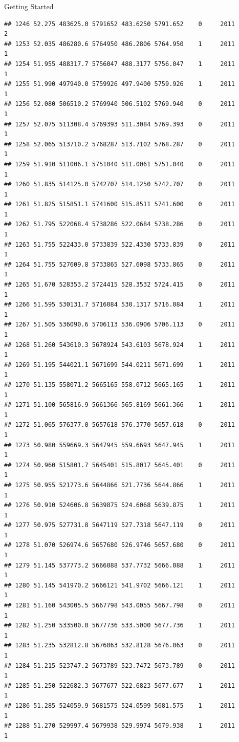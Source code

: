 \documentclass[
  ignorenonframetext,
]{beamer}
\begin{document}
\begin{frame}[fragile]{Getting Started}
\begin{verbatim}
## 1246 52.275 483625.0 5791652 483.6250 5791.652    0     2011        2
## 1253 52.035 486280.6 5764950 486.2806 5764.950    1     2011        1
## 1254 51.955 488317.7 5756047 488.3177 5756.047    1     2011        1
## 1255 51.990 497940.0 5759926 497.9400 5759.926    1     2011        1
## 1256 52.080 506510.2 5769940 506.5102 5769.940    0     2011        1
## 1257 52.075 511308.4 5769393 511.3084 5769.393    0     2011        1
## 1258 52.065 513710.2 5768287 513.7102 5768.287    0     2011        1
## 1259 51.910 511006.1 5751040 511.0061 5751.040    0     2011        1
## 1260 51.835 514125.0 5742707 514.1250 5742.707    0     2011        1
## 1261 51.825 515851.1 5741600 515.8511 5741.600    0     2011        1
## 1262 51.795 522068.4 5738286 522.0684 5738.286    0     2011        1
## 1263 51.755 522433.0 5733839 522.4330 5733.839    0     2011        1
## 1264 51.755 527609.8 5733865 527.6098 5733.865    0     2011        1
## 1265 51.670 528353.2 5724415 528.3532 5724.415    0     2011        1
## 1266 51.595 530131.7 5716084 530.1317 5716.084    1     2011        1
## 1267 51.505 536090.6 5706113 536.0906 5706.113    0     2011        1
## 1268 51.260 543610.3 5678924 543.6103 5678.924    1     2011        1
## 1269 51.195 544021.1 5671699 544.0211 5671.699    1     2011        1
## 1270 51.135 558071.2 5665165 558.0712 5665.165    1     2011        1
## 1271 51.100 565816.9 5661366 565.8169 5661.366    1     2011        1
## 1272 51.065 576377.0 5657618 576.3770 5657.618    0     2011        1
## 1273 50.980 559669.3 5647945 559.6693 5647.945    1     2011        1
## 1274 50.960 515801.7 5645401 515.8017 5645.401    0     2011        1
## 1275 50.955 521773.6 5644866 521.7736 5644.866    1     2011        1
## 1276 50.910 524606.8 5639875 524.6068 5639.875    1     2011        1
## 1277 50.975 527731.8 5647119 527.7318 5647.119    0     2011        1
## 1278 51.070 526974.6 5657680 526.9746 5657.680    0     2011        1
## 1279 51.145 537773.2 5666088 537.7732 5666.088    1     2011        1
## 1280 51.145 541970.2 5666121 541.9702 5666.121    1     2011        1
## 1281 51.160 543005.5 5667798 543.0055 5667.798    0     2011        1
## 1282 51.250 533500.0 5677736 533.5000 5677.736    1     2011        1
## 1283 51.235 532812.8 5676063 532.8128 5676.063    0     2011        1
## 1284 51.215 523747.2 5673789 523.7472 5673.789    0     2011        1
## 1285 51.250 522682.3 5677677 522.6823 5677.677    1     2011        1
## 1286 51.285 524059.9 5681575 524.0599 5681.575    1     2011        1
## 1288 51.270 529997.4 5679938 529.9974 5679.938    1     2011        1

\end{verbatim}
\end{frame}
\end{document}
